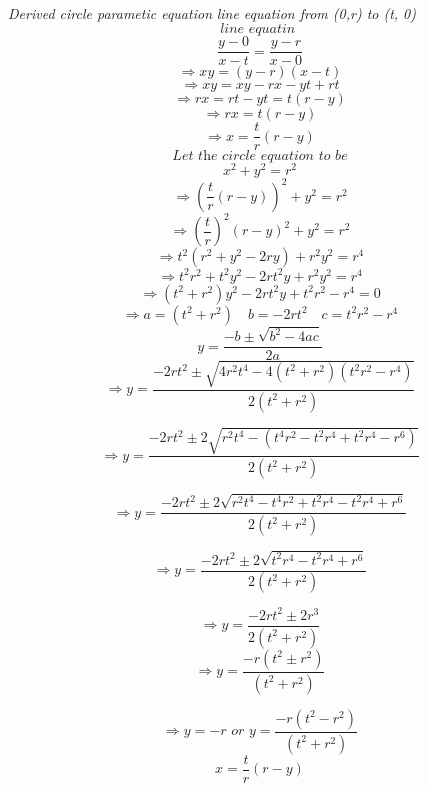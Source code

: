 \documentclass{article}
\begin{document}
    \\
	\textit{Derived circle parametic equation}
	\textit{line equation from (0,r) to (t, 0)}\\
	$$\textit{line equatin }$$
	$$\frac{y-0}{x-t}=\frac{y-r}{x-0}$$
	$$\Rightarrow xy=(y - r)(x - t)$$
	$$\Rightarrow xy=xy - rx - yt + rt$$
	$$\Rightarrow  rx=rt-yt=t(r-y) $$
	$$\Rightarrow  rx = t(r-y)$$
	$$\Rightarrow x = \frac{t}{r}(r-y)$$	
	$$\textit{Let the circle equation to be}$$
	$$x^{2} + y^{2} = r^{2}$$
	$$\Rightarrow \left (\frac{t}{r}(r-y)  \right )^{2} + y^{2}=r^{2}$$
	$$\Rightarrow \left (\frac{t}{r} \right )^{2}(r-y)^{2} + y^{2}=r^{2}$$
	$$\Rightarrow t^{2}(r^{2}+y^{2}-2ry) + r^{2}y^{2} = r^{4}$$
	$$\Rightarrow t^{2}r^{2} + t^{2}y^{2} - 2rt^{2}y + r^{2}y^{2}=r^{4}$$
	$$\Rightarrow (t^{2}+r^{2})y^{2} - 2rt^{2}y + t^{2}r^{2}-r^{4}=0$$
	$$\Rightarrow a=(t^{2}+r^{2})\quad b=-2rt^{2}\quad c=t^{2}r^{2}-r^{4}$$
	$$y=\frac{-b\pm\sqrt{b^{2}-4ac}}{2a}$$
	$$\Rightarrow y=\frac{-2rt^{2}\pm\sqrt{4r^{2}t^{4}-4(t^{2}+r^{2})(t^{2}r^{2}-r^{4})}}{2(t^{2}+r^{2})}$$

	$$\Rightarrow y=\frac{-2rt^{2}\pm 2\sqrt{r^{2}t^{4}-( t^{4}r^{2} - t^{2}r^{4} + t^{2}r^{4} - r^{6} )}}{2(t^{2}+r^{2})}$$

	$$\Rightarrow y=\frac{-2rt^{2}\pm 2\sqrt{r^{2}t^{4} - t^{4}r^{2} + t^{2}r^{4} - t^{2}r^{4} + r^{6} }}{2(t^{2}+r^{2})}$$
	
	$$\Rightarrow y=\frac{-2rt^{2}\pm 2\sqrt{ t^{2}r^{4} - t^{2}r^{4} + r^{6} }}{2(t^{2}+r^{2})}$$
	
	$$\Rightarrow y=\frac{-2rt^{2}\pm 2r^{3}}{2(t^{2}+r^{2})}$$
	$$\Rightarrow y=\frac{-r(t^{2}\pm r^{2})}{(t^{2}+r^{2})}$$
	
	$$\Rightarrow y=-r\textit{ or } y=\frac{-r(t^{2} - r^{2})}{(t^{2}+r^{2})}$$
	$$ x=\frac{t}{r}(r-y)$$
\end{document}

